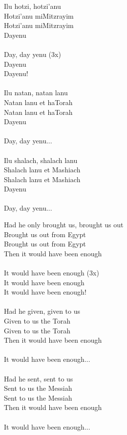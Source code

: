 \documentclass[10pt,oneside,footinclude=true,headinclude=true]{scrbook} %
\begin{document}
\begin{paracol}{2}
\begin{leftcolumn}
\noindent Ilu hotzi, hotzi'anu\\
Hotzi'anu miMitzrayim\\
Hotzi'anu miMitzrayim\\
Dayenu\\
\\
Day, day yenu (3x)\\
Dayenu\\
Dayenu!\\
\\
Ilu natan, natan lanu\\
Natan lanu et haTorah\\
Natan lanu et haTorah\\
Dayenu\\
\\
Day, day yenu...\\
\\
Ilu shalach, shalach lanu\\
Shalach lanu et Mashiach\\
Shalach lanu et Mashiach\\
Dayenu\\
\\
Day, day yenu...\\
\end{leftcolumn}
\begin{rightcolumn}
\noindent Had he only brought us, brought us out\\
Brought us out from Egypt\\
Brought us out from Egypt\\
Then it would have been enough\\
\\
It would have been enough (3x)\\
It would have been enough\\
It would have been enough!\\
\\
Had he given, given to us\\
Given to us the Torah\\
Given to us the Torah\\
Then it would have been enough\\
\\
It would have been enough...\\
\\
Had he sent, sent to us\\
Sent to us the Messiah\\
Sent to us the Messiah\\
Then it would have been enough\\
\\
It would have been enough...\\
\end{rightcolumn}
\end{paracol}
\end{document}
